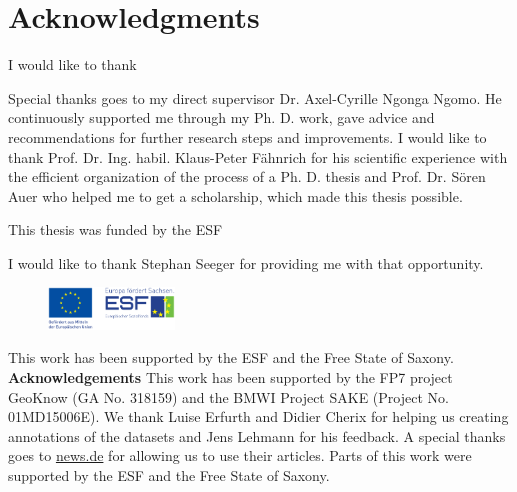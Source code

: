 



\bigskip

\begingroup
\let\clearpage\relax
\let\cleardoublepage\relax
\let\cleardoublepage\relax
\chapter*{Acknowledgments}
I would like to thank


Special thanks goes to my direct supervisor Dr. Axel-Cyrille Ngonga Ngomo.
He continuously supported me through my Ph. D. work, gave advice and recommendations for further research steps and improvements.
I would like to thank Prof. Dr. Ing. habil. Klaus-Peter F\"ahnrich for his scientific experience with the efficient organization of the process of a Ph. D. thesis and Prof. Dr. S\"oren Auer who helped me to get a scholarship, which made this thesis possible.   

This thesis was funded by the ESF

I would like to thank Stephan Seeger for providing me with that opportunity. 

\begin{figure}
 \vspace{-10mm}
 \includegraphics[width=0.3\textwidth]{figures/esf.pdf}
\end{figure}


This work has been supported by the ESF and the Free State of Saxony.
\textbf{Acknowledgements} This work has been supported by the FP7 project GeoKnow (GA No. 318159) and the BMWI Project SAKE (Project No. 01MD15006E).
We thank Luise Erfurth and Didier Cherix for helping us creating annotations of the datasets and Jens Lehmann for his feedback. A special thanks goes to \url{news.de} for allowing us to use their articles. Parts of this work were supported by the ESF and the Free State of Saxony.
\endgroup



